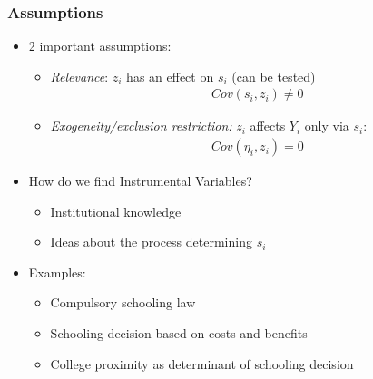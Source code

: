 \documentclass[pdftex]{beamer}
\begin{document}
\begin{frame}
\frametitle{Assumptions}
\begin{itemize}
\item 2 important assumptions:
   \begin {itemize}
    \item \emph{Relevance}: $z_{i}$ has an effect on $s_{i}$ (can be tested)
     \begin{eqnarray*}
            Cov\left(s_{i}, z_{i}\right)\neq 0
      \end{eqnarray*}
    \item \emph{Exogeneity/exclusion restriction:} $z_{i}$ affects $Y_{i}$ only via $s_{i}$:
     \begin{eqnarray*}
           Cov\left(\eta_{i}, z_{i}\right)= 0
      \end{eqnarray*}

\end{itemize}
\item How do we find Instrumental Variables?
     \begin {itemize}
     \item Institutional knowledge
     \item Ideas about the process determining $s_{i}$
\end {itemize}
\item Examples:
      \begin {itemize}
         \item Compulsory schooling law
          \item Schooling decision based on costs and benefits
          \item College proximity as determinant of schooling decision
\end {itemize}
\end {itemize}
\end{frame}


\end{document}
